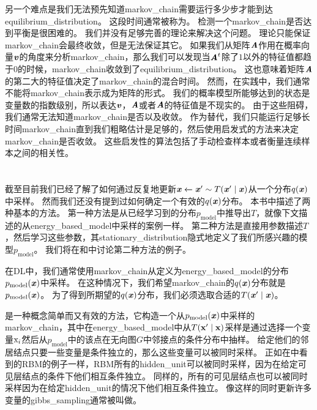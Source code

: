 另一个难点是我们无法预先知道\gls{markov_chain}需要运行多少步才能到达\gls{equilibrium_distribution}。 
这段时间通常被称为。
检测一个\gls{markov_chain}是否达到平衡是很困难的。
我们并没有足够完善的理论来解决这个问题。
理论只能保证\gls{markov_chain}会最终收敛，但是无法保证其它。
如果我们从矩阵$\boldsymbol{\mathit{A}}$作用在概率向量$\boldsymbol{\mathit{v}}$的角度来分析\gls{markov_chain}，那么我们可以发现当$\boldsymbol{\mathit{A}}^t$除了$1$以外的特征值都趋于$0$的时候，\gls{markov_chain}收敛到了\gls{equilibrium_distribution}。
这也意味着矩阵$\boldsymbol{\mathit{A}}$的第二大的特征值决定了\gls{markov_chain}的混合时间。
然而，在实践中，我们通常不能将\gls{markov_chain}表示成为矩阵的形式。
我们的概率模型所能够达到的状态是变量数的指数级别，所以表达$\boldsymbol{\mathit{v}}$，$\boldsymbol{\mathit{A}}$或者$\boldsymbol{\mathit{A}}$的特征值是不现实的。
由于这些阻碍，我们通常无法知道\gls{markov_chain}是否以及收敛。
作为替代，我们只能运行足够长时间\gls{markov_chain}直到我们粗略估计是足够的，然后使用启发式的方法来决定\gls{markov_chain}是否收敛。
这些启发性的算法包括了手动检查样本或者衡量连续样本之间的相关性。



\section{}
\label{sec:gibbs_sampling}

截至目前我们已经了解了如何通过反复地更新$\boldsymbol{\mathit{x}} \xleftarrow{} \boldsymbol{\mathit{x}}'\sim T(\boldsymbol{\mathit{x}}'\mid\boldsymbol{\mathit{x}})$从一个分布$q(\boldsymbol{\mathit{x}})$中采样。
然而我们还没有提到过如何确定一个有效的$q(\boldsymbol{\mathit{x}})$分布。
本书中描述了两种基本的方法。
第一种方法是从已经学习到的分布$p_{\text{model}}$中推导出$T$，就像下文描述的从\gls{energy_based_model}中采样的案例一样。
第二种方法是直接用参数描述$T$，然后学习这些参数，其\gls{stationary_distribution}隐式地定义了我们所感兴趣的模型$p_{\text{model}}$。
我们将在和中讨论第二种方法的例子。


在\gls{DL}中，我们通常使用\gls{markov_chain}从定义为\gls{energy_based_model}的分布$p_{\text{model}}(\boldsymbol{\mathit{x}})$中采样。
在这种情况下，我们希望\gls{markov_chain}的$q(\boldsymbol{\mathit{x}})$分布就是$p_{\text{model}}(\boldsymbol{\mathit{x}})$。
为了得到所期望的$q(\boldsymbol{\mathit{x}})$分布，我们必须选取合适的$T(\boldsymbol{\mathit{x}}'\mid \boldsymbol{\mathit{x}})$。


是一种概念简单而又有效的方法，它构造一个从$p_{\text{model}}(\boldsymbol{\mathit{x}})$中采样的\gls{markov_chain}，其中在\gls{energy_based_model}中从$T(\mathbf{x}'\mid \mathbf{x})$采样是通过选择一个变量$\mathrm{x}_i$然后从$p_{\text{model}}$中的该点在无向图$G$中邻接点的条件分布中抽样。
给定他们的邻居结点只要一些变量是条件独立的，那么这些变量可以被同时采样。
正如在中看到的\gls{RBM}的例子一样，\gls{RBM}所有的\gls{hidden_unit}可以被同时采样，因为在给定可见层结点的条件下他们相互条件独立。
同样的，所有的可见层结点也可以被同时采样因为在给定\gls{hidden_unit}的情况下他们相互条件独立。
像这样的同时更新许多变量的\gls{gibbs_sampling}通常被叫做。

